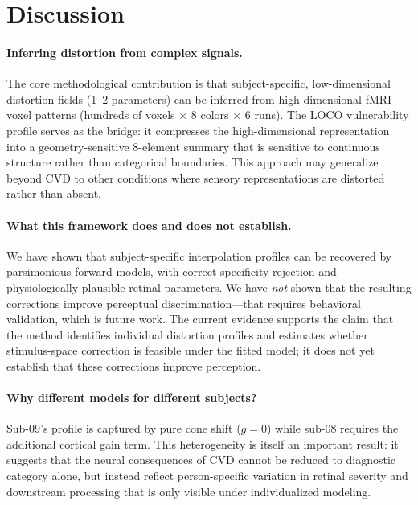\documentclass{article}
\begin{document}
\section{Discussion}
\label{sec:discussion}

\paragraph{Inferring distortion from complex signals.}
The core methodological contribution is that subject-specific, low-dimensional distortion fields (1--2 parameters) can be inferred from high-dimensional fMRI voxel patterns (hundreds of voxels $\times$ 8 colors $\times$ 6 runs).
The LOCO vulnerability profile serves as the bridge: it compresses the high-dimensional representation into a geometry-sensitive 8-element summary that is sensitive to continuous structure rather than categorical boundaries.
This approach may generalize beyond CVD to other conditions where sensory representations are distorted rather than absent.

\paragraph{What this framework does and does not establish.}
We have shown that subject-specific interpolation profiles can be recovered by parsimonious forward models, with correct specificity rejection and physiologically plausible retinal parameters.
We have \emph{not} shown that the resulting corrections improve perceptual discrimination---that requires behavioral validation, which is future work.
The current evidence supports the claim that the method identifies individual distortion profiles and estimates whether stimulus-space correction is feasible under the fitted model; it does not yet establish that these corrections improve perception.

\paragraph{Why different models for different subjects?}
Sub-09's profile is captured by pure cone shift ($g = 0$) while sub-08 requires the additional cortical gain term.
This heterogeneity is itself an important result: it suggests that the neural consequences of CVD cannot be reduced to diagnostic category alone, but instead reflect person-specific variation in retinal severity and downstream processing that is only visible under individualized modeling.
\end{document}
